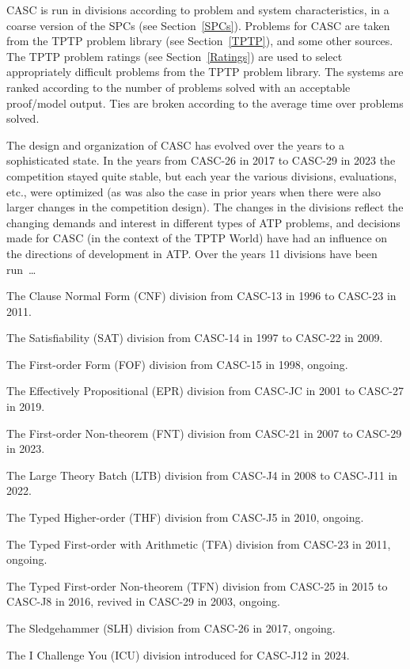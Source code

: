 \documentclass[runningheads]{llncs}
\newenvironment{packed_itemize}{
\vspace*{-0.2em}
\begin{itemize}
\setlength{\partopsep}{0pt}
\setlength{\itemsep}{1pt}
\setlength{\parskip}{0pt}
\setlength{\parsep}{0pt}
}{\end{itemize}}
\begin{document}
CASC is run in divisions according to problem and system characteristics, in a coarse version
of the SPCs (see Section~\ref{SPCs}).
Problems for CASC are taken from the TPTP problem library (see Section~\ref{TPTP}), and some 
other sources. 
The TPTP problem ratings (see Section~\ref{Ratings}) are used to select appropriately difficult
problems from the TPTP problem library.
The systems are ranked according to the number of problems solved with an acceptable proof/model 
output.
Ties are broken according to the average time over problems solved.

The design and organization of CASC has evolved over the years to a sophisticated state.
In the years from CASC-26 in 2017 to CASC-29 in 2023 the competition stayed quite stable, but 
each year the various divisions, evaluations, etc., were optimized (as was also the case in 
prior years when there were also larger changes in the competition design).
The changes in the divisions reflect the changing demands and interest in different types
of ATP problems, and decisions made for CASC (in the context of the TPTP World) have had an 
influence on the directions of development in ATP.
Over the years 11 divisions have been run~\ldots
\begin{packed_itemize}
\item The Clause Normal Form (CNF) division from CASC-13 in 1996 to CASC-23 in 2011.
\item The Satisfiability (SAT) division from CASC-14 in 1997 to CASC-22 in 2009.
\item The First-order Form (FOF) division from CASC-15 in 1998, ongoing.
\item The Effectively Propositional (EPR) division from CASC-JC in 2001 to CASC-27 in 2019.
\item The First-order Non-theorem (FNT) division from CASC-21 in 2007 to CASC-29 in 2023.
\item The Large Theory Batch (LTB) division from CASC-J4 in 2008 to CASC-J11 in 2022.
\item The Typed Higher-order (THF) division from CASC-J5 in 2010, ongoing.
\item The Typed First-order with Arithmetic (TFA) division from CASC-23 in 2011, ongoing.
\item The Typed First-order Non-theorem (TFN) division from CASC-25 in 2015 to CASC-J8 in 2016,
      revived in CASC-29 in 2003, ongoing.
\item The Sledgehammer (SLH) division from CASC-26 in 2017, ongoing.
\item The I Challenge You (ICU) division introduced for CASC-J12 in 2024.
\end{packed_itemize}
\end{document}
